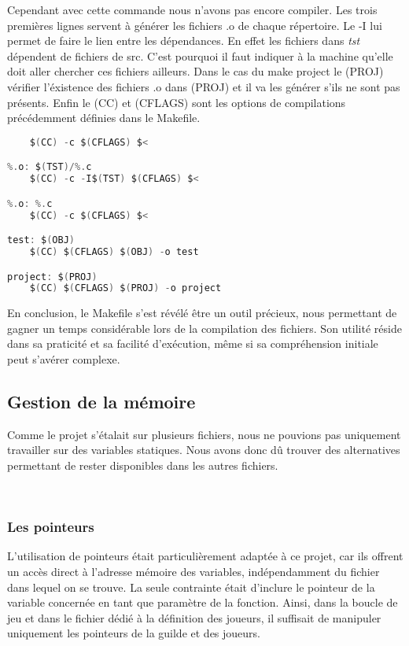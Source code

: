 \documentclass{article}
\begin{document}
\vspace{1em} Cependant avec cette commande nous n'avons pas encore compiler. Les trois premières lignes servent à générer les fichiers .o de chaque répertoire. Le -I lui permet de faire le lien entre les dépendances. En effet les fichiers dans \emph{tst} dépendent de fichiers de src. C'est  pourquoi il faut indiquer à la machine qu'elle doit aller chercher ces fichiers ailleurs. Dans le cas du make project le \textdollar(PROJ) vérifier l'éxistence des fichiers .o dans \textdollar(PROJ) et il va les générer s'ils ne sont pas présents. Enfin le \textdollar(CC) et \textdollar(CFLAGS) sont les options de compilations précédemment définies dans le Makefile.

\begin{tcolorbox}[colback=gray!10,colframe=white!75!black]
\begin{lstlisting}[language=C, caption={Commande de compilation}, label={lst:exemple1-c}]
%.o: $(SRC)/%.c
	$(CC) -c $(CFLAGS) $<

%.o: $(TST)/%.c
	$(CC) -c -I$(TST) $(CFLAGS) $<

%.o: %.c
	$(CC) -c $(CFLAGS) $<

test: $(OBJ)
	$(CC) $(CFLAGS) $(OBJ) -o test

project: $(PROJ)
	$(CC) $(CFLAGS) $(PROJ) -o project

\end{lstlisting}
\end{tcolorbox}
\vspace{1em} En conclusion, le Makefile s'est révélé être un outil précieux, nous permettant de gagner un temps considérable lors de la compilation des fichiers. Son utilité réside dans sa praticité et sa facilité d'exécution, même si sa compréhension initiale peut s'avérer complexe.

\subsection{Gestion de la mémoire}

\hspace{1em} Comme le projet s'étalait sur plusieurs fichiers, nous ne pouvions pas uniquement travailler sur des variables statiques. Nous avons donc dû trouver des alternatives permettant de rester disponibles dans les autres fichiers. 

\

\subsubsection{Les pointeurs}
\vspace{1em}
\hspace{1em}L'utilisation de pointeurs était particulièrement adaptée à ce projet, car ils offrent un accès direct à l'adresse mémoire des variables, indépendamment du fichier dans lequel on se trouve. La seule contrainte était d'inclure le pointeur de la variable concernée en tant que paramètre de la fonction. Ainsi, dans la boucle de jeu et dans le fichier dédié à la définition des joueurs, il suffisait de manipuler uniquement les pointeurs de la guilde et des joueurs.
\end{document}
